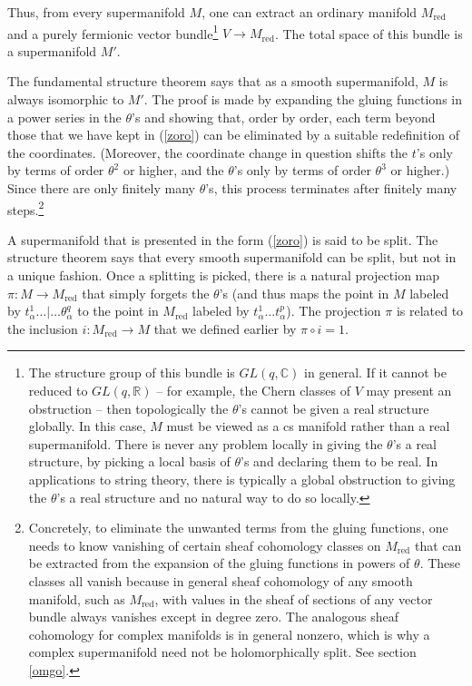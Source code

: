 \documentclass[11pt,a4paper]{article}
\def\red{{\mathrm{red}}}
\def\R{{\mathbb R}}
\def\C{{\mathbb C}}
\begin{document}
Thus, from every supermanifold $M$, one can extract an ordinary manifold $M_\red$ and a purely fermionic vector bundle\footnote{\label{humbug} The structure group
of this bundle is $GL(q,\C)$ in general.  If it cannot be reduced to $GL(q,\R)$ -- for example, the Chern classes of $V$ may present an obstruction --
then topologically the $\theta$'s cannot be given a real structure globally. In this case, $M$ must be viewed as a cs manifold rather than a real
supermanifold.  There is  never any
problem locally in giving the $\theta$'s a real structure, by picking a local basis
of $\theta$'s and declaring them to be real. In applications to string theory, there is typically a global obstruction to giving the $\theta$'s a real structure and no natural
way to do so locally.}  $V\to M_\red$.
The total space of this bundle is a supermanifold $M'$.  

The fundamental structure theorem says that as a smooth supermanifold, $M$ is always isomorphic to $M'$.  The proof is made by expanding
the gluing functions in a power series in the $\theta$'s and showing that, order by order, each term beyond those that we have kept
in (\ref{zoro}) can be eliminated by a suitable redefinition of the coordinates. (Moreover, the coordinate change in question shifts the $t$'s
only by terms of order $\theta^2$ or higher, and the $\theta$'s only by terms of order $\theta^3$ or higher.) 
Since there are only finitely many $\theta$'s, this process terminates
after finitely many steps.\footnote{Concretely, to eliminate the unwanted terms from the gluing functions, one needs
to know vanishing of certain sheaf cohomology classes on $M_\red$ that can be extracted from the expansion of the gluing functions in powers of
$\theta$.   These classes all vanish because in general  sheaf cohomology of any smooth
manifold, such as $M_\red$, with values in the sheaf of sections of any vector bundle always vanishes except in degree zero.  
The analogous sheaf cohomology for complex manifolds is in general
nonzero, which is why a complex supermanifold need not be holomorphically split.  See section \ref{omgo}.}                                                     
                                                      
                                                         

                                     
A supermanifold that is presented in the form (\ref{zoro})  is said to be split.   The structure theorem says that every smooth supermanifold
can be split, but not in a unique fashion. 
Once a splitting is picked, there is a natural  projection map $\pi:M\to M_\red$  that simply forgets
the $\theta$'s (and thus maps  the point in $M$ labeled by $t^1_\alpha\dots|\dots \theta^q_\alpha$ to the point in 
$M_\red$ labeled by $t^1_\alpha\dots t^p_\alpha$).  
The projection $\pi$ is related to the inclusion $i:M_\red\to M$ that we defined earlier by $\pi\circ i = 1$.
\end{document}
